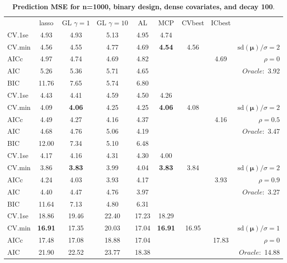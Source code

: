 \clearpage
\begin{table}\vspace{-.5cm}
\caption[l]{ { \bf Prediction MSE for n=1000, binary design, 
dense covariates, and  decay  100}.}
\vspace{-.5cm}
\footnotesize{}
\begin{center}
\begin{tabular}{l*{7}{c}|r}
 & lasso & GL $\gamma=1$ & GL $\gamma=10$ & AL & MCP  & CVbest & ICbest  \\
\cline{1-9}
CV.1se & 4.93 & 4.93 & 5.13 & 4.95 & 4.74 & & & \\
CV.min & 4.56 & 4.55 & 4.77 & 4.69 & {\bf 4.54} & 4.56 & & $\mathrm{sd}(\mathbf{\mu})/\sigma=2$ \\
AICc & 4.97 & 4.74 & 4.69 & 4.82 & & & 4.69 &  $\rho=0$ \\
AIC & 5.26 & 5.36 & 5.71 & 4.65 & & & &  \multirow{2}{*}{$Oracle: $ 3.92} \\
BIC & 11.76 & 7.65 & 5.74 & 6.80 & & & &  \\
 \hline 
CV.1se & 4.43 & 4.41 & 4.59 & 4.50 & 4.26 & & & \\
CV.min & 4.09 & {\bf 4.06} & 4.25 & 4.25 & {\bf 4.06} & 4.08 & & $\mathrm{sd}(\mathbf{\mu})/\sigma=2$ \\
AICc & 4.49 & 4.27 & 4.16 & 4.37 & & & 4.16 &  $\rho=0.5$ \\
AIC & 4.68 & 4.76 & 5.06 & 4.19 & & & &  \multirow{2}{*}{$Oracle: $ 3.47} \\
BIC & 12.00 & 7.34 & 5.10 & 6.48 & & & &  \\
 \hline 
CV.1se & 4.17 & 4.16 & 4.31 & 4.30 & 4.00 & & & \\
CV.min & 3.86 & {\bf 3.83} & 3.99 & 4.04 & {\bf 3.83} & 3.84 & & $\mathrm{sd}(\mathbf{\mu})/\sigma=2$ \\
AICc & 4.24 & 4.03 & 3.93 & 4.17 & & & 3.93 &  $\rho=0.9$ \\
AIC & 4.40 & 4.47 & 4.76 & 3.97 & & & &  \multirow{2}{*}{$Oracle: $ 3.27} \\
BIC & 11.64 & 7.13 & 4.80 & 6.31 & & & &  \\
 \hline 
CV.1se & 18.86 & 19.46 & 22.40 & 17.23 & 18.29 & & & \\
CV.min & {\bf 16.91} & 17.35 & 20.03 & 17.04 & {\bf 16.91} & 16.95 & & $\mathrm{sd}(\mathbf{\mu})/\sigma=1$ \\
AICc & 17.48 & 17.08 & 18.88 & 17.04 & & & 17.83 &  $\rho=0$ \\
AIC & 21.90 & 22.52 & 23.77 & 18.38 & & & &  \multirow{2}{*}{$Oracle: $ 14.88} \\

\end{tabular}
\end{center}
\end{table}
